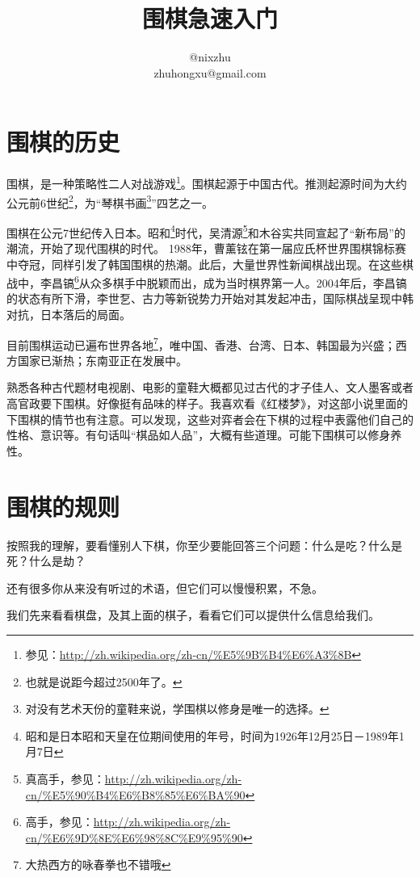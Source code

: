 \documentclass[12pt，a4paper, titlepage]{article}
\author{@nixzhu \\ zhuhongxu@gmail.com}
\title{围棋急速入门}
\begin{document}
\setlength{\parindent}{2em}  
\maketitle
\newpage

\tableofcontents	%
\newpage
\section{围棋的历史}
围棋，是一种策略性二人对战游戏\footnote{参见：\url{http://zh.wikipedia.org/zh-cn/\%E5\%9B\%B4\%E6\%A3\%8B}}。围棋起源于中国古代。推测起源时间为大约公元前6世纪\footnote{也就是说距今超过2500年了。}，为“琴棋书画\footnote{对没有艺术天份的童鞋来说，学围棋以修身是唯一的选择。}”四艺之一。

围棋在公元7世纪传入日本。昭和\footnote{昭和是日本昭和天皇在位期间使用的年号，时间为1926年12月25日－1989年1月7日}时代，吴清源\footnote{真高手，参见：\url{http://zh.wikipedia.org/zh-cn/\%E5\%90\%B4\%E6\%B8\%85\%E6\%BA\%90}}和木谷实共同宣起了“新布局”的潮流，开始了现代围棋的时代。
1988年，曹薰铉在第一届应氏杯世界围棋锦标赛中夺冠，同样引发了韩国围棋的热潮。此后，大量世界性新闻棋战出现。在这些棋战中，李昌镐\footnote{高手，参见：\url{http://zh.wikipedia.org/zh-cn/\%E6\%9D\%8E\%E6\%98\%8C\%E9\%95\%90}}从众多棋手中脱颖而出，成为当时棋界第一人。2004年后，李昌镐的状态有所下滑，李世乭、古力等新锐势力开始对其发起冲击，国际棋战呈现中韩对抗，日本落后的局面。

目前围棋运动已遍布世界各地\footnote{大热西方的咏春拳也不错哦}，唯中国、香港、台湾、日本、韩国最为兴盛；西方国家已渐热；东南亚正在发展中。

熟悉各种古代题材电视剧、电影的童鞋大概都见过古代的才子佳人、文人墨客或者高官政要下围棋。好像挺有品味的样子。我喜欢看《红楼梦》，对这部小说里面的下围棋的情节也有注意。可以发现，这些对弈者会在下棋的过程中表露他们自己的性格、意识等。有句话叫“棋品如人品”，大概有些道理。可能下围棋可以修身养性。

\section{围棋的规则}
按照我的理解，要看懂别人下棋，你至少要能回答三个问题：什么是吃？什么是死？什么是劫？

还有很多你从来没有听过的术语，但它们可以慢慢积累，不急。

我们先来看看棋盘，及其上面的棋子，看看它们可以提供什么信息给我们。
\end{document}
